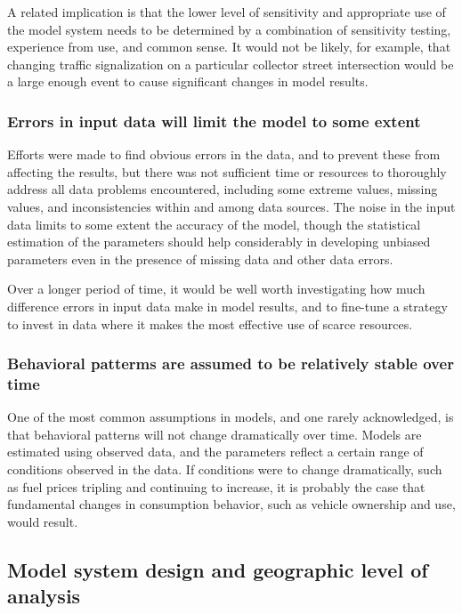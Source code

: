 A related implication is that the lower level of sensitivity and appropriate use of the model system needs to be determined by a combination of sensitivity testing, experience from use, and common sense. It would not be likely, for example, that changing traffic signalization on a particular collector street intersection would be a large enough event to cause significant changes in model results.

\subsubsection{Errors in input data will limit the model to some extent}

Efforts were made to find obvious errors in the data, and to prevent these from affecting the results, but there was not sufficient time or resources to thoroughly address all data problems encountered, including some extreme values, missing values, and inconsistencies within and among data sources. The noise in the input data limits to some extent the accuracy of the model, though the statistical estimation of the parameters should help considerably in developing unbiased parameters even in the presence of missing data and other data errors.

Over a longer period of time, it would be well worth investigating how much difference errors in input data make in model results, and to fine-tune a strategy to invest in data where it makes the most effective use of scarce resources.

\subsubsection{Behavioral patterms are assumed to be relatively stable over time}

One of the most common assumptions in models, and one rarely acknowledged, is that behavioral patterns will not change dramatically over time. Models are estimated using observed data, and the parameters reflect a certain range of conditions observed in the data. If conditions were to change dramatically, such as fuel prices tripling and continuing to increase, it is probably the case that fundamental changes in consumption behavior, such as vehicle ownership and use, would result.



\subsection{Model system design and geographic level of analysis}

